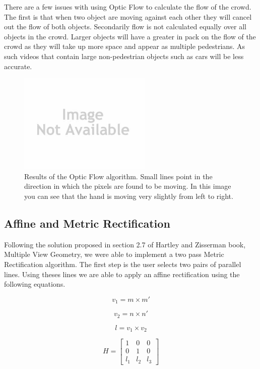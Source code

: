 \documentclass[conference]{IEEEtran}
\begin{document}
There are a few issues with using Optic Flow to calculate the flow of the crowd. The first is that when two object are moving against each other they will cancel out the flow of both objects. Secondarily flow is not calculated equally over all objects in the crowd. Larger objects will have a greater in pack on the flow of the crowd as they will take up more space and appear as multiple pedestrians. As such videos that contain large non-pedestrian objects such as cars will be less accurate.

\begin{figure}[!t]
\centering
\includegraphics[width=2.5in]{noImage.jpg}
\caption{Results of the Optic Flow algorithm. Small lines point in the direction in which the pixels are found to be moving. In this image you can see that the hand is moving very slightly from left to right.}
\label{Optic_Flow}
\end{figure}

\subsection{Affine and Metric Rectification}

Following the solution proposed in section 2.7 of Hartley and Zisserman book, Multiple View Geometry, we were able to implement a two pass Metric Rectification algorithm. The first step is the user selects two pairs of parallel lines. Using theses lines we are able to apply an affine rectification using the following equations.

\begin{equation}
v_1 = m \times m'
\end{equation}

\begin{equation}
v_2 = n \times n'
\end{equation}

\begin{equation}
l = v_1 \times v_2
\end{equation}

\begin{equation}
H =
\begin{bmatrix}
1 & 0 & 0\\ 
0 & 1 & 0\\ 
l_1 & l_2 & l_3 
\end{bmatrix}
\end{equation}
\end{document}
